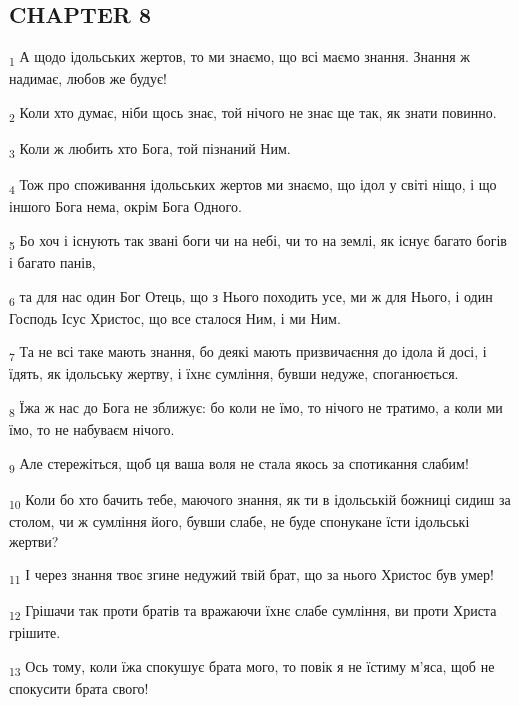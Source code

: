 \subsection{CHAPTER 8}
\begin{tcolorbox}
\textsubscript{1} А щодо ідольських жертов, то ми знаємо, що всі маємо знання. Знання ж надимає, любов же будує!
\end{tcolorbox}
\begin{tcolorbox}
\textsubscript{2} Коли хто думає, ніби щось знає, той нічого не знає ще так, як знати повинно.
\end{tcolorbox}
\begin{tcolorbox}
\textsubscript{3} Коли ж любить хто Бога, той пізнаний Ним.
\end{tcolorbox}
\begin{tcolorbox}
\textsubscript{4} Тож про споживання ідольських жертов ми знаємо, що ідол у світі ніщо, і що іншого Бога нема, окрім Бога Одного.
\end{tcolorbox}
\begin{tcolorbox}
\textsubscript{5} Бо хоч і існують так звані боги чи на небі, чи то на землі, як існує багато богів і багато панів,
\end{tcolorbox}
\begin{tcolorbox}
\textsubscript{6} та для нас один Бог Отець, що з Нього походить усе, ми ж для Нього, і один Господь Ісус Христос, що все сталося Ним, і ми Ним.
\end{tcolorbox}
\begin{tcolorbox}
\textsubscript{7} Та не всі таке мають знання, бо деякі мають призвичаєння до ідола й досі, і їдять, як ідольську жертву, і їхнє сумління, бувши недуже, споганюється.
\end{tcolorbox}
\begin{tcolorbox}
\textsubscript{8} Їжа ж нас до Бога не зближує: бо коли не їмо, то нічого не тратимо, а коли ми їмо, то не набуваєм нічого.
\end{tcolorbox}
\begin{tcolorbox}
\textsubscript{9} Але стережіться, щоб ця ваша воля не стала якось за спотикання слабим!
\end{tcolorbox}
\begin{tcolorbox}
\textsubscript{10} Коли бо хто бачить тебе, маючого знання, як ти в ідольській божниці сидиш за столом, чи ж сумління його, бувши слабе, не буде спонукане їсти ідольські жертви?
\end{tcolorbox}
\begin{tcolorbox}
\textsubscript{11} І через знання твоє згине недужий твій брат, що за нього Христос був умер!
\end{tcolorbox}
\begin{tcolorbox}
\textsubscript{12} Грішачи так проти братів та вражаючи їхнє слабе сумління, ви проти Христа грішите.
\end{tcolorbox}
\begin{tcolorbox}
\textsubscript{13} Ось тому, коли їжа спокушує брата мого, то повік я не їстиму м'яса, щоб не спокусити брата свого!
\end{tcolorbox}
